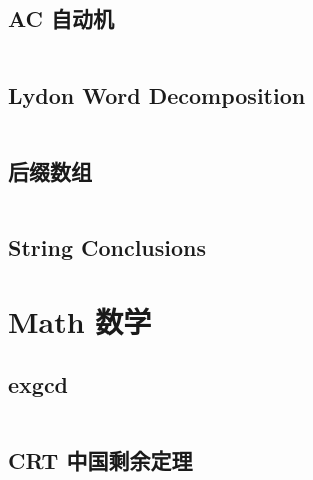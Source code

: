 \documentclass[titlepage, a4paper]{article}
\newcommand\nothing{}
\renewcommand{\checkmark}[0]{\nothing}
\begin{document}
\begin{multicols}{2}
\begin{spacing}{0.6}
				\subsection{AC 自动机}
				\inputminted{cpp}{src/String/AC 自动机.cpp}
				\subsection{Lydon Word Decomposition}
				\inputminted{cpp}{src/String/Lyndon Word.cpp}
				\subsection{后缀数组\checkmark}
				\inputminted{cpp}{src/String/SA.cpp}
				\subsection{String Conclusions}
				
			
			\section{Math 数学}
				\subsection{exgcd}
				\inputminted{cpp}{src/Math/exgcd.cpp}
				\subsection{CRT 中国剩余定理}
				\inputminted{cpp}{src/Math/CRT_lbn.cpp}

\end{spacing}
\end{multicols}
\end{document}
